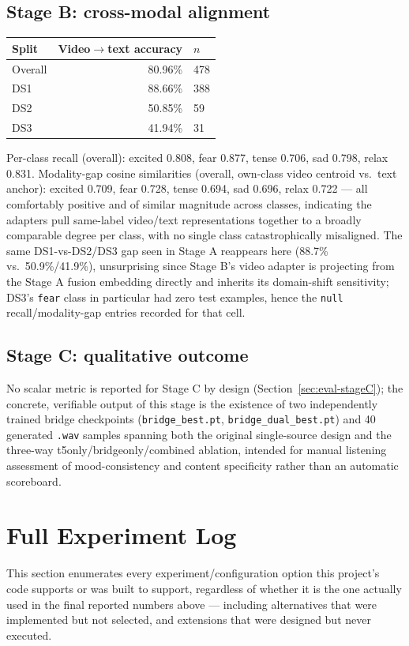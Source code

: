 \documentclass[11pt]{article}
\begin{document}
\subsection{Stage B: cross-modal alignment}
\begin{center}
\begin{tabular}{@{}lrl@{}}
\toprule
Split & Video$\to$text accuracy & $n$ \\
\midrule
Overall & 80.96\% & 478 \\
DS1 & 88.66\% & 388 \\
DS2 & 50.85\% & 59 \\
DS3 & 41.94\% & 31 \\
\bottomrule
\end{tabular}
\end{center}
Per-class recall (overall): excited 0.808, fear 0.877, tense 0.706, sad 0.798, relax 0.831.
Modality-gap cosine similarities (overall, own-class video centroid vs.\ text anchor): excited
0.709, fear 0.728, tense 0.694, sad 0.696, relax 0.722 --- all comfortably positive and of similar
magnitude across classes, indicating the adapters pull same-label video/text representations
together to a broadly comparable degree per class, with no single class catastrophically
misaligned. The same DS1-vs-DS2/DS3 gap seen in Stage A reappears here (88.7\% vs.\ 50.9\%/41.9\%),
unsurprising since Stage B's video adapter is projecting from the Stage A fusion embedding directly
and inherits its domain-shift sensitivity; DS3's \texttt{fear} class in particular had zero test
examples, hence the \texttt{null} recall/modality-gap entries recorded for that cell.

\subsection{Stage C: qualitative outcome}
No scalar metric is reported for Stage C by design (Section~\ref{sec:eval-stageC}); the concrete,
verifiable output of this stage is the existence of two independently trained bridge checkpoints
(\texttt{bridge\_best.pt}, \texttt{bridge\_dual\_best.pt}) and 40 generated \texttt{.wav} samples
spanning both the original single-source design and the three-way t5only/bridgeonly/combined
ablation, intended for manual listening assessment of mood-consistency and content specificity
rather than an automatic scoreboard.

\section{Full Experiment Log}
\label{sec:experiments}
This section enumerates every experiment/configuration option this project's code supports or was
built to support, regardless of whether it is the one actually used in the final reported numbers
above --- including alternatives that were implemented but not selected, and extensions that were
designed but never executed.
\end{document}
